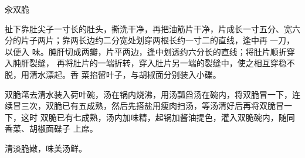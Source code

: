 %
%
%
%
%
%
%
\begin{recipe}{汆双脆}

\ingredients


\preparation

\step 扯下靠肚尖子一寸长的肚头，撕洗干净，再把油筋片干净，片成长一寸五分、宽六
分的片子两片；靠两长边约二分宽处划穿两根长约一寸二的直线，逢中再𠟤一刀，以便入
味。肫肝切成两瓣，片平两边，逢中划透约六分长的直线；将肚片顺折穿入肫肝裂缝，
再将肚片的一端折转，穿入肚片另一端的裂缝中，使之相互穿稳不脱，用清水漂起。香
菜掐留叶子，与胡椒面分别装入小碟。

\step 双脆滗去清水装入荷叶碗，汤在锅内烧沸，用汤瓢舀汤在碗内，将双脆冒一下，连
续冒三次，双脆已有五成熟，然后先搭盐用瘦肉扫汤，等汤清好后再将双脆冒一下，这时
双脆已有七成熟，汤内加味精，起锅加酱油提色，灌入双脆碗内，随同香菜、胡椒面碟子
上席。

\features

清淡脆嫩，味美汤鲜。

\end{recipe}

